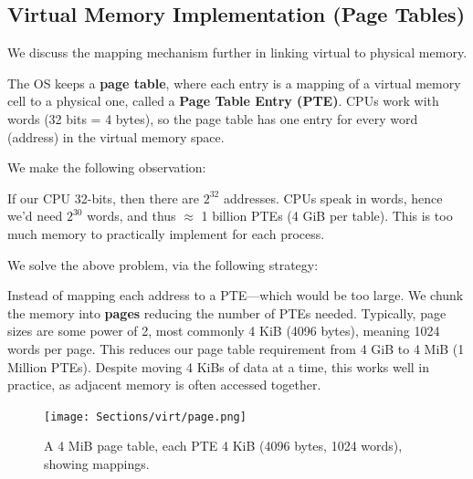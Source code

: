 \subsection{Virtual Memory Implementation (Page Tables)}
\noindent
We discuss the mapping mechanism further in linking virtual to physical memory.
\begin{Def}

    The OS keeps a \textbf{page table}, where each entry is a mapping of a virtual memory cell to a physical one, called a \textbf{Page Table Entry (PTE)}.
    CPUs work with words (32 bits = 4 bytes), so the page table has one entry for every word (address) in the virtual memory space.
\end{Def}

\newpage 

\noindent
We make the following observation:
\begin{theo}

    If our CPU 32-bits, then there are $2^{32}$ addresses. CPUs speak in words, hence we'd need $2^{30}$ words, and thus $\approx$ 1 billion PTEs (4 GiB per table).
    This is too much memory to practically implement for each process.
\end{theo}

\noindent
We solve the above problem, via the following strategy:

\begin{Def}
    
    Instead of mapping each address to a PTE---which would be too large. We
    chunk the memory into \textbf{pages} reducing the number of PTEs needed. Typically, page sizes 
    are some power of 2, most commonly 4 KiB (4096 bytes), meaning 1024 words per page. This reduces our 
    page table requirement from 4 GiB to 4 MiB (1 Million PTEs). Despite moving 4 KiBs of data at a time, this works
    well in practice, as adjacent memory is often accessed together. 
\end{Def}

\begin{figure}[h]
    \centering
    \texttt{[image: Sections/virt/page.png]}
    
    \vspace{1em}
    \caption{A 4 MiB page table, each PTE 4 KiB (4096 bytes, 1024 words), showing mappings.}
    
    \label{fig:virt4}
\end{figure}


